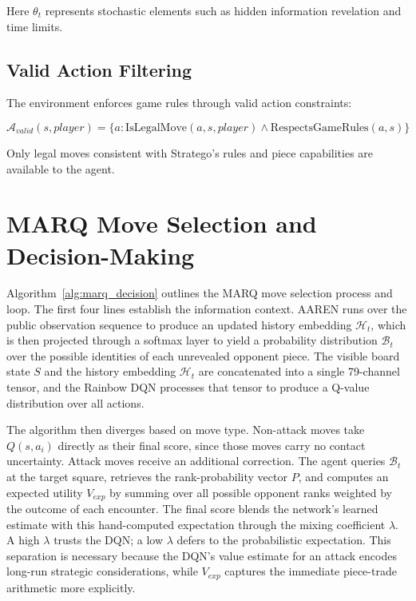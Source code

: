 Here $\theta_t$ represents stochastic elements such as hidden information revelation and time limits.

\subsection{Valid Action Filtering}
The environment enforces game rules through valid action constraints:

\begin{equation}
\mathcal{A}_{valid}(s, player) = \{a : \text{IsLegalMove}(a, s, player) \land \text{RespectsGameRules}(a, s)\}
\end{equation}

Only legal moves consistent with Stratego's rules and piece capabilities are available to the agent.


\section{MARQ Move Selection and Decision-Making}

Algorithm~\ref{alg:marq_decision} outlines the MARQ move selection process and loop. The first four lines establish the information context. AAREN runs over the public observation sequence to produce an updated history embedding $\mathcal{H}_t$, which is then projected through a softmax layer to yield a probability distribution $\mathcal{B}_t$ over the possible identities of each unrevealed opponent piece. The visible board state $S$ and the history embedding $\mathcal{H}_t$ are concatenated into a single 79-channel tensor, and the Rainbow DQN processes that tensor to produce a Q-value distribution over all actions.

The algorithm then diverges based on move type. Non-attack moves take $Q(s, a_i)$ directly as their final score, since those moves carry no contact uncertainty. Attack moves receive an additional correction. The agent queries $\mathcal{B}_t$ at the target square, retrieves the rank-probability vector $P$, and computes an expected utility $V_{exp}$ by summing over all possible opponent ranks weighted by the outcome of each encounter. The final score blends the network's learned estimate with this hand-computed expectation through the mixing coefficient $\lambda$. A high $\lambda$ trusts the DQN; a low $\lambda$ defers to the probabilistic expectation. This separation is necessary because the DQN's value estimate for an attack encodes long-run strategic considerations, while $V_{exp}$ captures the immediate piece-trade arithmetic more explicitly.

